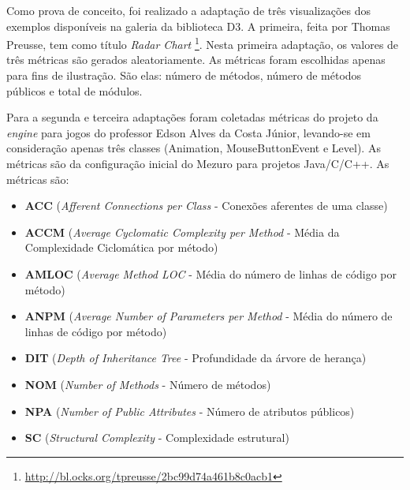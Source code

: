 Como prova de conceito, foi realizado a adaptação de três visualizações dos
exemplos disponíveis na galeria da biblioteca D3. A primeira, feita por Thomas
Preusse, tem como título \textit{Radar Chart}
\footnote{\url{http://bl.ocks.org/tpreusse/2bc99d74a461b8c0acb1}}. Nesta
primeira adaptação, os valores de três métricas são gerados aleatoriamente. As
métricas foram escolhidas apenas para fins de ilustração. São elas: número de
métodos, número de métodos públicos e total de módulos.

Para a segunda e terceira adaptações foram coletadas métricas do projeto da
\textit{engine} para jogos do professor Edson Alves da Costa Júnior, levando-se
em consideração apenas três classes (Animation, MouseButtonEvent e Level). As
métricas são da configuração inicial do Mezuro para projetos Java/C/C++. As
métricas são:

\begin{itemize}
  \item \textbf{ACC} (\textit{Afferent Connections per Class} - Conexões
	aferentes de uma classe)
  \item \textbf{ACCM} (\textit{Average Cyclomatic Complexity per Method} -
	Média da Complexidade Ciclomática por método)
  \item \textbf{AMLOC} (\textit{Average Method LOC} - Média do número de linhas
	de código por método)
  \item \textbf{ANPM} (\textit{Average Number of Parameters per Method} - Média
	do número de linhas de código por método)
  \item \textbf{DIT} (\textit{Depth of Inheritance Tree} - Profundidade da
	árvore de herança)
  \item \textbf{NOM} (\textit{Number of Methods} - Número de métodos)
  \item \textbf{NPA} (\textit{Number of Public Attributes} - Número de
	atributos públicos)
  \item \textbf{SC} (\textit{Structural Complexity} - Complexidade estrutural)
\end{itemize}




